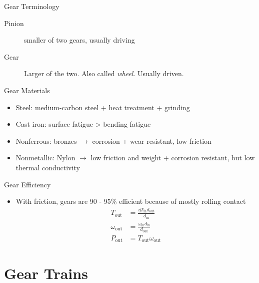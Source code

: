 \documentclass[
10pt,
a4paper,
openany,
svgnames,
]{book}
\begin{document}
\begin{frame}{Gear Terminology}
  \begin{description}
    \item[Pinion] smaller of two gears, usually driving
    \item[Gear] Larger of the two. Also called \emph{wheel}. Usually driven.
  \end{description}
\end{frame}

\begin{frame}{Gear Materials}
  \begin{itemize}
    \item Steel: medium-carbon steel + heat treatment + grinding
    \item Cast iron: surface fatigue > bending fatigue
    \item Nonferrous: bronzes $\rightarrow$ corrosion + wear resistant, low friction
    \item Nonmetallic: Nylon $\rightarrow$ low friction and weight + corrosion resistant, but low thermal conductivity
  \end{itemize}
\end{frame}
\begin{frame}{Gear Efficiency}
  \begin{itemize}
    \item With friction, gears are 90 - 95\% efficient because of mostly rolling contact
      \begin{align*}
        T_{\text{out}} &= \frac{\eta T_{\text{in}} d_{\text{out}}}{d_{\text{in}}} \\
        \omega_{\text{out}} &= \frac{\omega_{\text{in}} d_{\text{in}}}{d_{\text{out}}} \\
        P_{\text{out}} &= T_{\text{out}} \omega_{\text{out}}
      \end{align*}
  \end{itemize}
\end{frame}

%
\section{Gear Trains}
\end{document}
